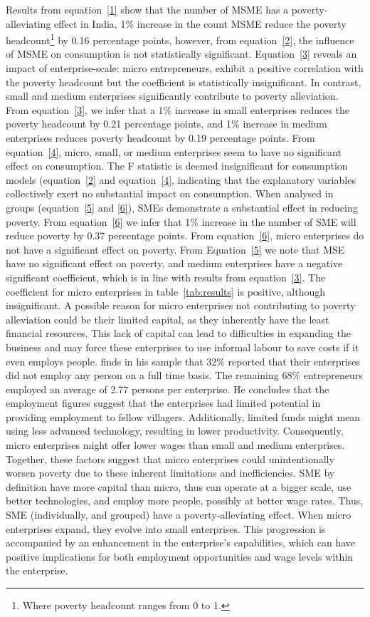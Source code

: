 \documentclass [12pt]{article}
\begin{document}
\text Results from equation~\ref{1} show that the number of MSME has a poverty-alleviating effect in India, 1\% increase in the count MSME reduce the poverty headcount\footnote{Where poverty headcount ranges from 0 to 1.} by 0.16 percentage points, however, from equation~\ref{2}, the influence of MSME on consumption is not statistically significant. Equation~\ref{3} reveals an impact of enterprise-scale: micro entrepreneurs, exhibit a positive correlation with the poverty headcount but the coefficient is statistically insignificant. In contrast, small and medium enterprises significantly contribute to poverty alleviation. From equation~\ref{3}, we infer that a 1\% increase in small enterprises reduces the poverty headcount by 0.21 percentage points, and 1\% increase in medium enterprises reduces poverty headcount by 0.19 percentage points. From equation~\ref{4}, micro, small, or medium enterprises seem to have no significant effect on consumption. The F statistic is deemed insignificant for consumption models (equation~\ref{2} and equation~\ref{4}, indicating that the explanatory variables collectively exert no substantial impact on consumption. When analysed in groups (equation~\ref{5} and \ref{6}), SMEs demonstrate a substantial effect in reducing poverty. From equation~\ref{6} we infer that 1\% increase in the number of SME will reduce poverty by 0.37 percentage points. From equation~\ref{6}, micro enterprises do not have a significant effect on poverty. From Equation~\ref{5} we note that MSE have no significant effect on poverty, and medium enterprises have a negative significant coefficient, which is in line with results from equation~\ref{3}.  
\text The coefficient for micro enterprises in table~\ref{tab:results} is positive, although insignificant.  A possible reason for micro enterprises not contributing to poverty alleviation could be their limited capital, as they inherently have the least financial resources. This lack of capital can lead to difficulties in expanding the business and may force these enterprises to use informal labour to save costs if it even employs people. \textcite{kanitkar1994entrepreneurs} finds in his sample that 32\% reported that their enterprises did not employ any person on a full time basis. The remaining 68\% entrepreneurs employed an average of 2.77 persons per enterprise. He concludes that the employment figures suggest that the enterprises had limited potential in providing employment to fellow villagers.
 \text Additionally, limited funds might mean using less advanced technology, resulting in lower productivity. Consequently, micro enterprises might offer lower wages than small and medium enterprises. Together, these factors suggest that micro enterprises could unintentionally worsen poverty due to these inherent limitations and inefficiencies. SME by definition have more capital than micro, thus can operate at a bigger scale, use better technologies, and employ more people, possibly at better wage rates. Thus, SME (individually, and grouped) have a poverty-alleviating effect. When micro enterprises expand, they evolve into small enterprises. This progression is accompanied by an enhancement in the enterprise's capabilities, which can have positive implications for both employment opportunities and wage levels within the enterprise.
\end{document}
